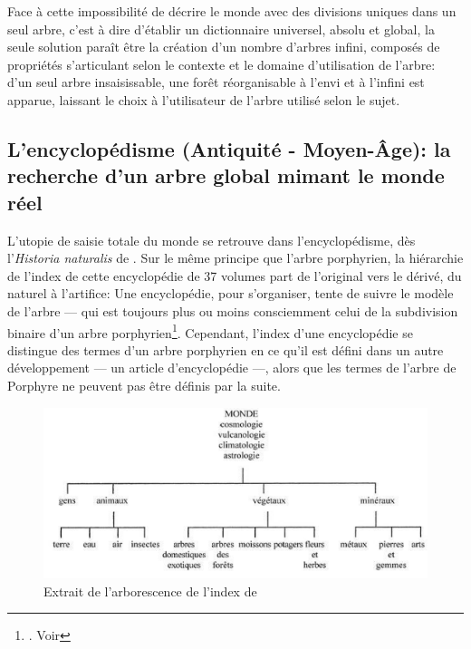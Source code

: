 Face à cette impossibilité de décrire le monde avec des divisions uniques dans un seul arbre, c'est à dire d'établir un dictionnaire universel, absolu et global, la seule solution paraît être la création d'un nombre d'arbres infini, composés de propriétés s'articulant selon le contexte et le domaine d'utilisation de l'arbre: d'un seul arbre insaisissable, une forêt réorganisable à l'envi et à l'infini est apparue, laissant le choix à l'utilisateur de l'arbre utilisé selon le sujet.

\subsection{\label{I-C-1-b}L'encyclopédisme (Antiquité - Moyen-Âge): la recherche d'un arbre global mimant le monde réel}

L'utopie de saisie totale du monde se retrouve dans l'encyclopédisme, dès l'\textit{Historia naturalis} de . Sur le même principe que l'arbre porphyrien, la hiérarchie de l'index de cette encyclopédie de 37 volumes part de l'original vers le dérivé, du naturel à l'artifice: \og Une encyclopédie, pour s’organiser, tente de suivre le modèle de l’arbre --- qui est toujours plus ou moins consciemment celui de la subdivision binaire d’un arbre porphyrien\fg{}\footnote{\cite[chap.1]{eco_arbre_2010}. Voir }. Cependant, l'index d'une encyclopédie se distingue des termes d'un arbre porphyrien en ce qu'il est défini dans un autre développement --- un article d'encyclopédie ---, alors que les termes de l'arbre de Porphyre ne peuvent pas être définis par la suite.

\begin{figure}[!h]
	\centering
	\includegraphics[width= 13cm]{images/index_pline.png}
	\caption{Extrait de l'arborescence de l'index de }
	\label{index_pline}
\end{figure}

